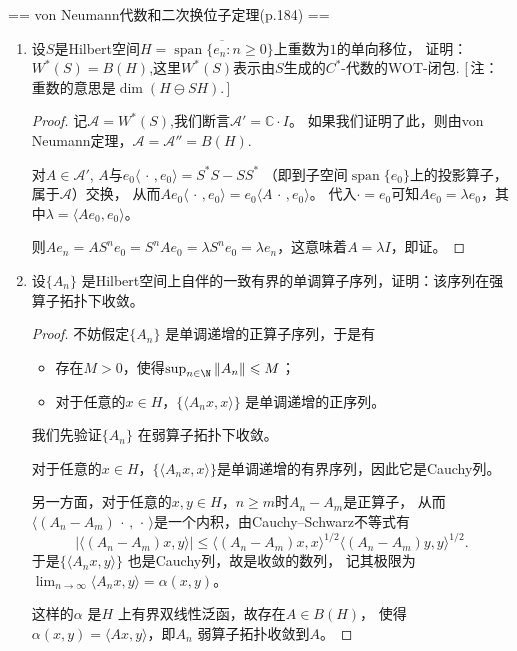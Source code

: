 == von Neumann代数和二次换位子定理(p.184) ==
\begin{enumerate}
\item[1]
设$S$是Hilbert空间$H= \overline{\operatorname{span}\{ e_n:n\geqslant 0 \}}$上重数为$1$的单向移位，
证明：$W^*(S)=B(H)$,这里$W^*(S)$表示由$S$生成的$C^*$-代数的WOT-闭包.
[\,注：重数的意思是$\dim(H \ominus SH)$.\,]
\begin{proof}
记$\mathscr{A}=W^*(S)$,我们断言$\mathscr{A}'=\mathbb{C} \cdot I$。
如果我们证明了此，则由von Neumann定理，$\mathscr{A}=\mathscr{A}''=B(H)$.

对$A\in \mathscr{A}'$, $A$与$e_0\langle\,\cdot\,,e_0\rangle =S^*S-SS^*$
（即到子空间$\operatorname{span}\{e_0\}$上的投影算子，属于$\mathscr{A}$）交换，
从而$Ae_0\langle \,\cdot\,,e_0\rangle  = e_0\langle A\,\cdot\,,e_0\rangle$。
代入$\cdot=e_0$可知$Ae_0= \lambda e_0$，其中$\lambda= \langle Ae_0,e_0\rangle$。

则$Ae_n=AS^ne_0=S^nAe_0=\lambda S^ne_0=\lambda e_n$，这意味着$A=\lambda I$，即证。
\end{proof}

\item[3]
设$ \{A_{n}\} $ 是Hilbert空间上自伴的一致有界的单调算子序列，证明：该序列在强算子拓扑下收敛。
\begin{proof}
    不妨假定$ \{A_{n}\} $ 是单调递增的正算子序列，于是有
    \begin{itemize}
        \item 存在$ M>0 $，使得$ \sup_{n\in\N}{\| A_{n} \| } \leqslant M $；
        \item 对于任意的$ x\in H $，$ \{\langle A_{n}x,x \rangle \} $ 是单调递增的正序列。
    \end{itemize}
    我们先验证$ \{A_{n}\} $ 在弱算子拓扑下收敛。

    对于任意的$ x\in H $，$ \{\langle A_{n}x,x \rangle \} $是单调递增的有界序列，因此它是Cauchy列。

    另一方面，对于任意的$ x,y\in H $，$n \geqslant m$时$A_n-A_m$是正算子，
    从而$\langle(A_n-A_m)\,\cdot\,,\,\cdot\,\rangle$是一个内积，由Cauchy--Schwarz不等式有
    $$
     |\langle (A_{n}-A_{m})x,y \rangle | \leqslant \langle (A_{n}-A_{m})x,x \rangle^{1/2} \langle (A_{n}-A_{m})y,y \rangle^{1/2}.
    $$ 
    于是$ \{\langle A_{n}x,y \rangle\} $ 也是Cauchy列，故是收敛的数列，
    记其极限为$ \lim_{n\to \infty}{\langle A_{n}x,y \rangle} = \alpha(x,y) $。

    这样的$ \alpha $ 是$ H $ 上有界双线性泛函，故存在$ A\in B(H) $，
    使得$\alpha(x,y)=\langle Ax,y \rangle$，即$ {A_{n}} $ 弱算子拓扑收敛到$ A $。


\end{proof}
\end{enumerate}

